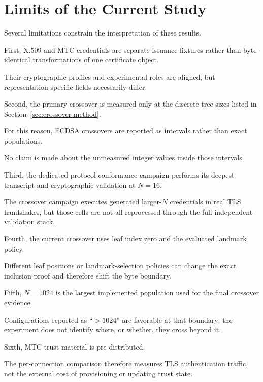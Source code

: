 \documentclass[journal]{IEEEtran}
\begin{document}
\section{Limits of the Current Study}



Several limitations constrain the interpretation of these results.



First, X.509 and MTC credentials are separate issuance fixtures rather than byte-identical transformations of one certificate object.

Their cryptographic profiles and experimental roles are aligned, but representation-specific fields necessarily differ.



Second, the primary crossover is measured only at the discrete tree sizes listed in Section~\ref{sec:crossover-method}.

For this reason, ECDSA crossovers are reported as intervals rather than exact populations.

No claim is made about the unmeasured integer values inside those intervals.



Third, the dedicated protocol-conformance campaign performs its deepest transcript and cryptographic validation at $N=16$.

The crossover campaign executes generated larger-$N$ credentials in real TLS handshakes, but those cells are not all reprocessed through the full independent validation stack.



Fourth, the current crossover uses leaf index zero and the evaluated landmark policy.

Different leaf positions or landmark-selection policies can change the exact inclusion proof and therefore shift the byte boundary.



Fifth, $N=1024$ is the largest implemented population used for the final crossover evidence.

Configurations reported as ``$>1024$'' are favorable at that boundary; the experiment does not identify where, or whether, they cross beyond it.



Sixth, MTC trust material is pre-distributed.

The per-connection comparison therefore measures TLS authentication traffic, not the external cost of provisioning or updating trust state.
\end{document}
